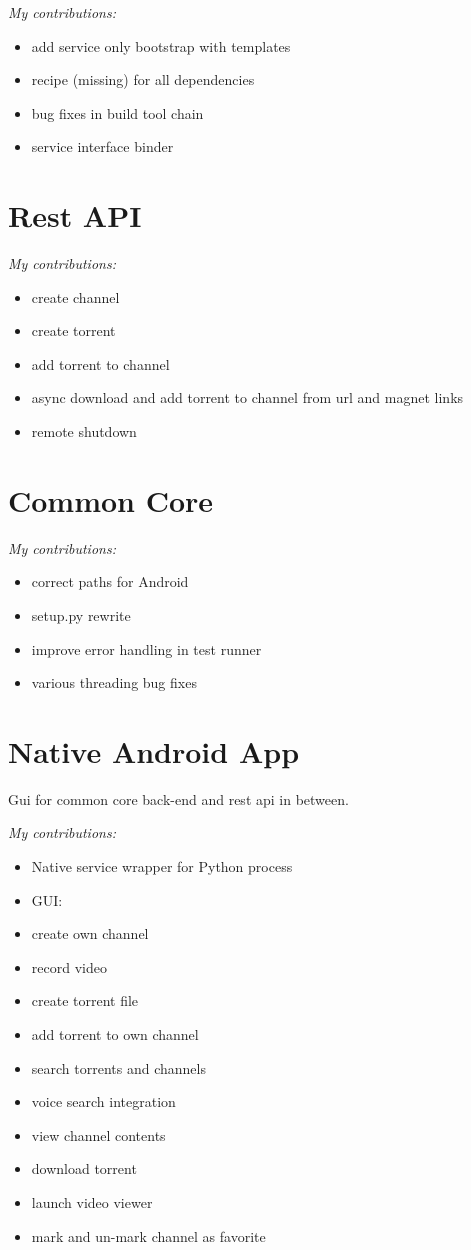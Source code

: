 \documentclass[]{report}
\begin{document}
\emph{My contributions:}
\begin{itemize}
	\item add service only bootstrap with templates
	\item recipe (missing) for all dependencies
	\item bug fixes in build tool chain
	\item service interface binder
\end{itemize}


\section{Rest API}

\emph{My contributions:}
\begin{itemize}
	\item create channel
	\item create torrent
	\item add torrent to channel
	\item async download and add torrent to channel from url and magnet links
	\item remote shutdown
\end{itemize}

\section{Common Core}

\emph{My contributions:}
\begin{itemize}
	\item correct paths for Android
	\item setup.py rewrite
	\item improve error handling in test runner
	\item various threading bug fixes
\end{itemize}


\section{Native Android App}
Gui for common core back-end and rest api in between.

\emph{My contributions:}
\begin{itemize}
	\item Native service wrapper for Python process
	\item GUI:
	\item create own channel
	\item record video
	\item create torrent file
	\item add torrent to own channel
	\item search torrents and channels
	\item voice search integration
	\item view channel contents
	\item download torrent
	\item launch video viewer
	\item mark and un-mark channel as favorite
\end{itemize}
\end{document}
